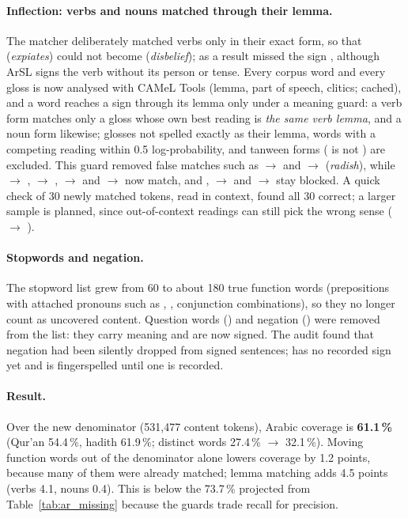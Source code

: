 \paragraph{Inflection: verbs and nouns matched through their lemma.} The matcher deliberately matched verbs only in their
exact form, so that  (\emph{expiates}) could not become  (\emph{disbelief}); as a result 
missed the sign , although ArSL signs the verb without its person or tense. Every corpus word and every gloss is now analysed
with CAMeL Tools (lemma, part of speech, clitics; cached), and a word reaches a sign through its lemma only under a meaning guard:
a verb form matches only a gloss whose own best reading is \emph{the same verb lemma}, and a noun form likewise; glosses not
spelled exactly as their lemma, words with a competing reading within 0.5 log-probability, and tanween forms ( is not ) are
excluded. This guard removed false matches such as  $\to$  and  $\to$  (\emph{radish}), while
 $\to$ ,  $\to$ ,  $\to$  and  $\to$  now match, and
,  $\to$  and  $\to$  stay blocked. A quick check of 30 newly matched tokens, read in context,
found all 30 correct; a larger sample is planned, since out-of-context readings can still pick the wrong sense ( $\to$ ).

\paragraph{Stopwords and negation.} The stopword list grew from 60 to about 180 true function words (prepositions with attached
pronouns such as , , conjunction combinations), so they no longer count as uncovered content.
Question words () and negation () were removed from the list: they carry meaning and are now
signed. The audit found that negation had been silently dropped from signed sentences;  has no recorded sign yet and is
fingerspelled until one is recorded.

\paragraph{Result.} Over the new denominator (531,477 content tokens), Arabic coverage is \textbf{61.1\,\%} (Qur'an 54.4\,\%, hadith
61.9\,\%; distinct words 27.4\,\% $\to$ 32.1\,\%). Moving function words out of the denominator alone lowers coverage by 1.2 points, because
many of them were already matched; lemma matching adds 4.5 points (verbs 4.1, nouns 0.4). This is below the 73.7\,\% projected
from Table~\ref{tab:ar_missing} because the guards trade recall for precision.

